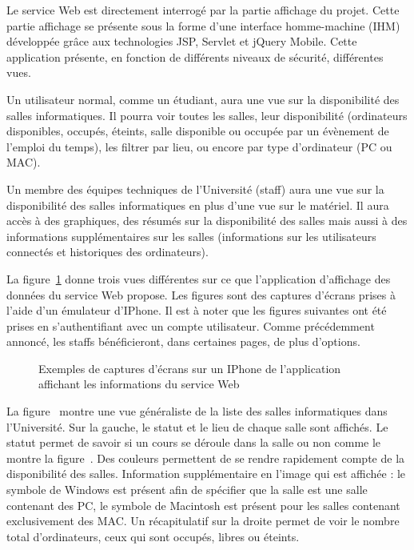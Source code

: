 Le service Web est directement interrog\'e par la partie affichage du projet.
Cette partie affichage se pr\'esente sous la forme d'une interface homme-machine (IHM) d\'evelopp\'ee gr\^ace aux technologies JSP, Servlet et jQuery Mobile.
Cette application pr\'esente, en fonction de diff\'erents niveaux de s\'ecurit\'e, diff\'erentes vues.

Un utilisateur normal, comme un \'etudiant, aura une vue sur la disponibilit\'e des salles informatiques.
Il pourra voir toutes les salles, leur disponibilit\'e (ordinateurs disponibles, occup\'es, \'eteints, salle disponible ou occup\'ee par un \'ev\`enement de l'emploi du temps), les filtrer par lieu, ou encore par type d'ordinateur (PC ou MAC).

Un membre des \'equipes techniques de l'Universit\'e (staff) aura une vue sur la disponibilit\'e des salles informatiques en plus d'une vue sur le mat\'eriel.
Il aura acc\`es \`a des graphiques, des r\'esum\'es sur la disponibilit\'e des salles mais aussi \`a des informations suppl\'ementaires sur les salles (informations sur les utilisateurs connect\'es et historiques des ordinateurs).

La figure~\ref{figure:exempleIPhone} donne trois vues diff\'erentes sur ce que l'application d'affichage des donn\'ees du service Web propose.
Les figures sont des captures d'\'ecrans prises \`a l'aide d'un \'emulateur d'IPhone.
Il est \`a noter que les figures suivantes ont \'et\'e prises en s'authentifiant avec un compte utilisateur.
Comme pr\'ec\'edemment annonc\'e, les staffs b\'en\'eficieront, dans certaines pages, de plus d'options.

\begin{figure}[!ht]
	\centering
	\qquad
	\qquad
	\caption{Exemples de captures d'\'ecrans sur un IPhone de l'application affichant les informations du service Web}
	\label{figure:exempleIPhone}

\end{figure}

La figure~ montre une vue g\'en\'eraliste de la liste des salles informatiques dans l'Universit\'e.
Sur la gauche, le statut et le lieu de chaque salle sont affich\'es. 
Le statut permet de savoir si un cours se d\'eroule dans la salle ou non comme le montre la figure~.
Des couleurs permettent de se rendre rapidement compte de la disponibilit\'e des salles.
Information suppl\'ementaire en l'image qui est affich\'ee : le symbole de Windows est pr\'esent afin de sp\'ecifier que la salle est une salle contenant des PC, le symbole de Macintosh est pr\'esent pour les salles contenant exclusivement des MAC.
Un r\'ecapitulatif sur la droite permet de voir le nombre total d'ordinateurs, ceux qui sont occup\'es, libres ou \'eteints.

